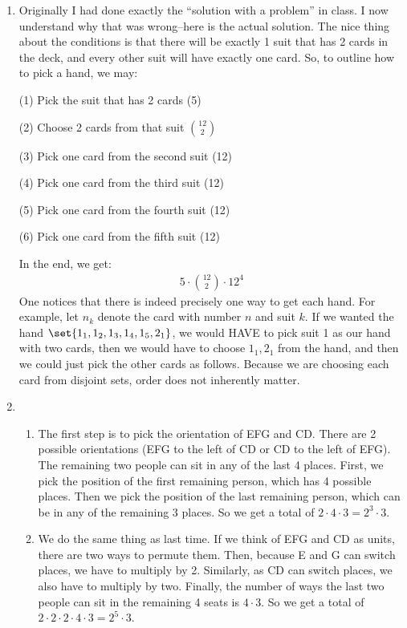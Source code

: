 \documentclass[12pt]{article}
\theoremstyle{definition}
\theoremstyle{remark}
\begin{document}
\begin{enumerate}[leftmargin=\labelsep]
		\newpage
		\item Originally I had done exactly the ``solution with a problem'' in class. I now understand why that was wrong--here is the actual solution. The nice thing about the conditions is that there will be exactly 1 suit that has 2 cards in the deck, and every other suit will have exactly one card. So, to outline how to pick a hand, we may:
		
		(1) Pick the suit that has 2 cards (5)
		
		(2) Choose 2 cards from that suit ${12 \choose 2}$
		
		(3) Pick one card from the second suit (12)
		
		(4) Pick one card from the third suit (12)
		
		(5) Pick one card from the fourth suit (12)
		
		(6) Pick one card from the fifth suit (12)
		
		In the end, we get:
		\begin{align*}
			5 \cdot {12 \choose 2} \cdot 12^4
		\end{align*}
		One notices that there is indeed precisely one way to get each hand. For example, let $n_k$ denote the card with number $n$ and suit $k$. If we wanted the hand $\set{1_1, 1_2, 1_3, 1_4, 1_5, 2_1}$, we would HAVE to pick suit 1 as our hand with two cards, then we would have to choose $1_1, 2_1$ from the hand, and then we could just pick the other cards as follows. Because we are choosing each card from disjoint sets, order does not inherently matter.
		
		\newpage
		\item \begin{enumerate}
			\item The first step is to pick the orientation of EFG and CD. There are 2 possible orientations (EFG to the left of CD or CD to the left of EFG). The remaining two people can sit in any of the last 4 places. First, we pick the position of the first remaining person, which has 4 possible places. Then we pick the position of the last remaining person, which can be in any of the remaining 3 places. So we get a total of $2 \cdot 4 \cdot 3 = 2^3 \cdot 3$.
			\item We do the same thing as last time. If we think of EFG and CD as units, there are two ways to permute them. Then, because E and G can switch places, we have to multiply by 2. Similarly, as CD can switch places, we also have to multiply by two. Finally, the number of ways the last two people can sit in the remaining 4 seats is $4 \cdot 3$. So we get a total of $2 \cdot 2 \cdot 2 \cdot 4 \cdot 3 = 2^5 \cdot 3$.
			

\end{enumerate}
\end{enumerate}
\end{document}
